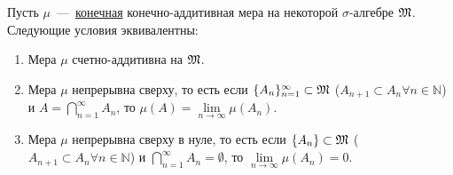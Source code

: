 \hypertarget{upper_continious}{}
\begin{theorem}
    Пусть $\mu$~---~\underline{конечная} конечно-аддитивная мера на некоторой $\sigma$-алгебре $\mathfrak{M}$. Следующие условия эквивалентны:
    \begin{enumerate}
        \item Мера $\mu$ счетно-аддитивна на $\mathfrak{M}$.
        \item Мера $\mu$ непрерывна сверху, то есть если $\{A_n\}_{n = 1}^\infty \subset \mathfrak{M}$ ($A_{n + 1} \subset A_n \forall n \in \mathbb{N}$) и $A = \bigcap\limits_{n = 1}^{\infty}{A_n}$, то $\mu(A) = \lim\limits_{n \longrightarrow \infty}{\mu(A_n)}$.
        \item Мера $\mu$ непрерывна сверху в нуле, то есть если $\{A_n\} \subset \mathfrak{M}$ ($A_{n + 1} \subset A_n \forall n \in \mathbb{N}$) и $\bigcap\limits_{n = 1}^{\infty} A_n= \emptyset$, то $\lim\limits_{n \longrightarrow \infty}{\mu(A_n)} = 0$.
    \end{enumerate}
\end{theorem}
